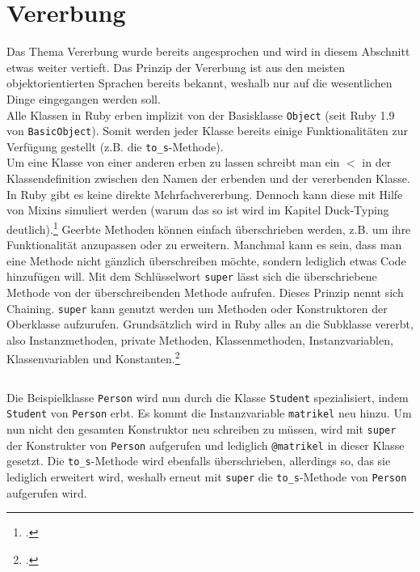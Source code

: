 \documentclass[a4paper, 11pt]{scrreprt}
\begin{document}
\section{Vererbung}
Das Thema Vererbung wurde bereits angesprochen und wird in diesem Abschnitt etwas weiter vertieft. Das Prinzip der Vererbung ist aus den meisten objektorientierten Sprachen bereits bekannt, weshalb nur auf die wesentlichen Dinge eingegangen werden soll.\\
Alle Klassen in Ruby erben implizit von der Basisklasse \texttt{Object} (seit Ruby 1.9 von \texttt{BasicObject}). Somit werden jeder Klasse bereits einige Funktionalitäten zur Verfügung gestellt (z.B. die \texttt{to\_s}-Methode).\\
Um eine Klasse von einer anderen erben zu lassen schreibt man ein \texttt{$<$} in der Klassendefinition zwischen den Namen der erbenden und der vererbenden Klasse.\\
In Ruby gibt es keine direkte Mehrfachvererbung. Dennoch kann diese mit Hilfe von Mixins simuliert werden (warum das so ist wird im Kapitel Duck-Typing deutlich).\footcite[vgl.][S.71-77]{p_ruby} Geerbte Methoden können einfach überschrieben werden, z.B. um ihre Funktionalität anzupassen oder zu erweitern. Manchmal kann es sein, dass man eine Methode nicht gänzlich überschreiben möchte, sondern lediglich etwas Code hinzufügen will. Mit dem Schlüsselwort \texttt{super} lässt sich die überschriebene Methode von der überschreibenden Methode aufrufen. Dieses Prinzip nennt sich Chaining. \texttt{super} kann genutzt werden um Methoden oder Konstruktoren der Oberklasse aufzurufen. Grundsätzlich wird in Ruby alles an die Subklasse vererbt, also Instanzmethoden, private Methoden, Klassenmethoden, Instanzvariablen, Klassenvariablen und Konstanten.\footcite[vgl.][S.234-241]{ruby_lang}
\inputminted[]{ruby}{student.rb}
Die Beispielklasse \texttt{Person} wird nun durch die Klasse \texttt{Student} spezialisiert, indem \texttt{Student} von \texttt{Person} erbt. Es kommt die Instanzvariable \texttt{matrikel} neu hinzu. Um nun nicht den gesamten Konstruktor neu schreiben zu müssen, wird mit \texttt{super} der Konstrukter von \texttt{Person} aufgerufen und lediglich \texttt{@matrikel} in dieser Klasse gesetzt. Die \texttt{to\_s}-Methode wird ebenfalls überschrieben, allerdings so, das sie lediglich erweitert wird, weshalb erneut mit \texttt{super} die \texttt{to\_s}-Methode von \texttt{Person} aufgerufen wird.
\end{document}
